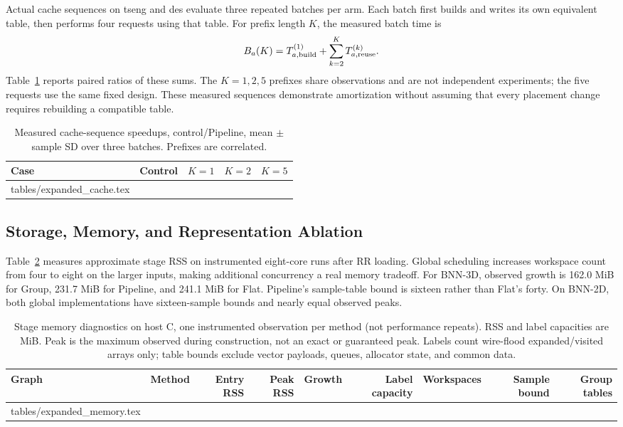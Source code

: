 \documentclass[conference,10pt,letterpaper]{IEEEtran}
\makeatletter
\newcommand{\tableinput}[1]{\@@input #1 }
\makeatother
\begin{document}
Actual cache sequences on tseng and des evaluate three repeated batches per arm. Each batch first builds and writes its own equivalent table, then performs four requests using that table. For prefix length $K$, the measured batch time is
\begin{equation}
 B_a(K)=T_{a,\rm build}^{(1)}+\sum_{k=2}^{K}T_{a,\rm reuse}^{(k)}.
\end{equation}
Table~\ref{tab:cache} reports paired ratios of these sums. The $K=1,2,5$ prefixes share observations and are not independent experiments; the five requests use the same fixed design. These measured sequences demonstrate amortization without assuming that every placement change requires rebuilding a compatible table.

\begin{table}[t]
\centering\scriptsize
\caption{Measured cache-sequence speedups, control/Pipeline, mean $\pm$ sample SD over three batches. Prefixes are correlated.}
\label{tab:cache}
\setlength{\tabcolsep}{3pt}
\begin{tabular}{llrrr}
\toprule
Case & Control & $K=1$ & $K=2$ & $K=5$ \\
\midrule
\tableinput{tables/expanded_cache.tex}
\bottomrule
\end{tabular}
\end{table}

\subsection{Storage, Memory, and Representation Ablation}
Table~\ref{tab:memory} measures approximate stage RSS on instrumented eight-core runs after RR loading. Global scheduling increases workspace count from four to eight on the larger inputs, making additional concurrency a real memory tradeoff. For BNN-3D, observed growth is 162.0 MiB for Group, 231.7 MiB for Pipeline, and 241.1 MiB for Flat. Pipeline's sample-table bound is sixteen rather than Flat's forty. On BNN-2D, both global implementations have sixteen-sample bounds and nearly equal observed peaks.

\begin{table}[t]
\centering\footnotesize
\caption{Stage memory diagnostics on host C, one instrumented observation per method (not performance repeats). RSS and label capacities are MiB. Peak is the maximum observed during construction, not an exact or guaranteed peak. Labels count wire-flood expanded/visited arrays only; table bounds exclude vector payloads, queues, allocator state, and common data.}
\label{tab:memory}
\setlength{\tabcolsep}{4pt}
\begin{tabular}{llrrrrrrr}
\toprule
Graph & Method & Entry RSS & Peak RSS & Growth & Label capacity & Workspaces & Sample bound & Group tables \\
\midrule
\tableinput{tables/expanded_memory.tex}
\bottomrule
\end{tabular}
\end{table}
\end{document}
